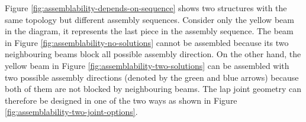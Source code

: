 Figure \ref{fig:assemblability-depends-on-sequence} shows two structures with the same topology but different assembly sequences. Consider only the yellow beam in the diagram, it represents the last piece in the assembly sequence. The beam in Figure \ref{fig:assemblability-no-solutions} cannot be assembled because its two neighbouring beams block all possible assembly direction. On the other hand, the yellow beam in Figure \ref{fig:assemblability-two-solutions} can be assembled with two possible assembly directions (denoted by the green and blue arrows) because both of them are not blocked by neighbouring beams. The lap joint geometry can therefore be designed in one of the two ways as shown in Figure \ref{fig:assemblability-two-joint-options}.

